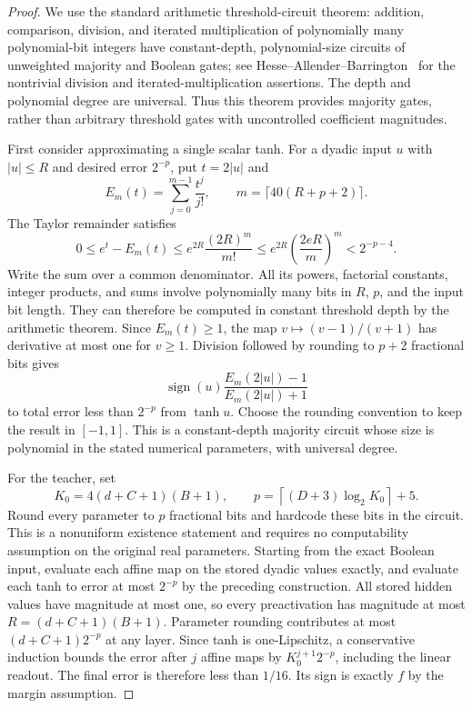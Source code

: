 \begin{proof}
We use the standard arithmetic threshold-circuit theorem: addition,
comparison, division, and iterated multiplication of polynomially many
polynomial-bit integers have constant-depth, polynomial-size circuits
of unweighted majority and Boolean gates; see
Hesse--Allender--Barrington~\cite{hesse2002} for the nontrivial division
and iterated-multiplication assertions. The depth and polynomial degree
are universal. Thus this theorem provides majority gates, rather than
arbitrary threshold gates with uncontrolled coefficient magnitudes.

First consider approximating a single scalar tanh.
For a dyadic input $u$ with $|u|\le R$ and desired error $2^{-p}$,
put $t=2|u|$ and
\[
 E_m(t)=\sum_{j=0}^{m-1}\frac{t^j}{j!},
 \qquad m=\lceil40(R+p+2)\rceil.
\]
The Taylor remainder satisfies
\[
 0\le e^t-E_m(t)
 \le e^{2R}\frac{(2R)^m}{m!}
 \le e^{2R}\left(\frac{2eR}{m}\right)^m
 <2^{-p-4}.
\]
Write the sum over a common denominator. All its powers, factorial
constants, integer products, and sums involve polynomially many bits
in $R$, $p$, and the input bit length. They can therefore be computed
in constant threshold depth by the arithmetic theorem. Since
$E_m(t)\ge1$, the map $v\mapsto(v-1)/(v+1)$ has derivative at most
one for $v\ge1$. Division followed by rounding to $p+2$ fractional
bits gives
\[
 \operatorname{sign}(u)\frac{E_m(2|u|)-1}{E_m(2|u|)+1}
\]
to total error less than $2^{-p}$ from $\tanh u$.
Choose the rounding convention to keep the result in $[-1,1]$.
This is a constant-depth majority circuit whose size is polynomial
in the stated numerical parameters, with universal degree.

For the teacher, set
\[
 K_0=4(d+C+1)(B+1),\qquad
 p=\left\lceil(D+3)\log_2 K_0\right\rceil+5.
\]
Round every parameter to $p$ fractional bits and hardcode these bits
in the circuit. This is a nonuniform existence statement and requires
no computability assumption on the original real parameters.
Starting from the exact
Boolean input, evaluate each affine map on the stored dyadic values
exactly, and evaluate each tanh to error at most $2^{-p}$ by the
preceding construction. All stored hidden values have magnitude at
most one, so every preactivation has magnitude at most
$R=(d+C+1)(B+1)$.
Parameter rounding contributes at most $(d+C+1)2^{-p}$ at any layer.
Since tanh is one-Lipschitz, a conservative induction bounds the
error after $j$ affine maps by $K_0^{j+1}2^{-p}$, including the linear
readout. The final error is therefore less than $1/16$.
Its sign is exactly $f$ by the margin assumption.


\end{proof}
